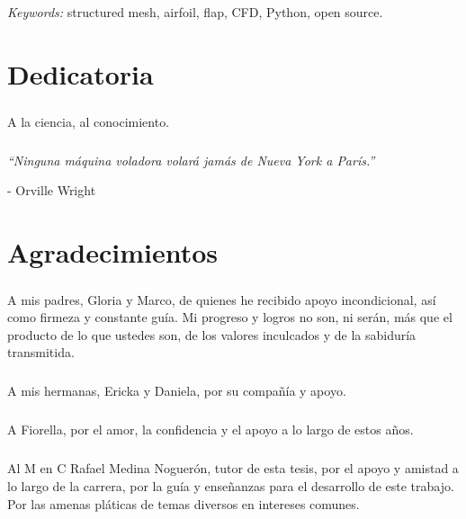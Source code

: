 \documentclass[letterpaper, openright, 12pt]{book}
\begin{document}
    \paragraph*{}
    \emph{Keywords:} structured mesh, airfoil, flap, CFD, Python, open source.
    \chapter*{Dedicatoria}
    \paragraph*{}
    A la ciencia, al conocimiento.

    \paragraph*{}
    \begin{flushright}
        \emph{``Ninguna máquina voladora volará jamás de Nueva York a París.''}

        - Orville Wright
    \end{flushright}


    \chapter*{Agradecimientos}
    \paragraph*{}
    A mis padres, Gloria y Marco, de quienes he recibido apoyo incondicional,
    así como firmeza y constante guía. Mi progreso y logros no son, ni serán,
    más que el producto de lo que ustedes son, de los valores inculcados y de
    la sabiduría transmitida.

    \paragraph*{}
    A mis hermanas, Ericka y Daniela, por su compañía y apoyo.

    \paragraph*{}
    A Fiorella, por el amor, la confidencia y el apoyo a lo largo de estos
    años.

    \paragraph*{}
    Al M en C Rafael Medina Noguerón, tutor de esta tesis, por el apoyo y
    amistad a lo largo de la carrera, por la guía y enseñanzas para el
    desarrollo de este trabajo. Por las amenas pláticas de temas diversos en
    intereses comunes.
\end{document}
